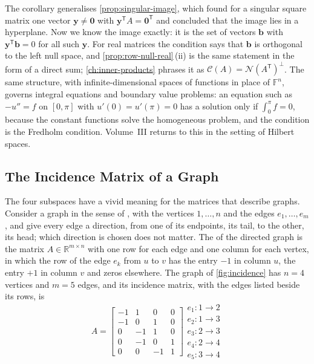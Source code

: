 The corollary generalises \cref{prop:singular-image}, which found for a singular square matrix one vector $\mathbf y\ne\mathbf 0$ with $\mathbf y^{\mathsf T}A=\mathbf 0^{\mathsf T}$ and concluded that the image lies in a hyperplane. Now we know the image exactly: it is the set of vectors $\mathbf b$ with $\mathbf y^{\mathsf T}\mathbf b=0$ for all such $\mathbf y$. For real matrices the condition says that $\mathbf b$ is orthogonal to the left null space, and \cref{prop:row-null-real}\,(ii) is the same statement in the form of a direct sum; \cref{ch:inner-products} phrases it as $\mathcal C(A)=\mathcal N(A^{\mathsf T})^\perp$. The same structure, with infinite-dimensional spaces of functions in place of $\mathbb F^n$, governs integral equations and boundary value problems: an equation such as $-u''=f$ on $[0,\pi]$ with $u'(0)=u'(\pi)=0$ has a solution only if $\int_0^\pi f=0$, because the constant functions solve the homogeneous problem, and the condition is the Fredholm condition. Volume~III returns to this in the setting of Hilbert spaces.

\subsection{The Incidence Matrix of a Graph}

The four subspaces have a vivid meaning for the matrices that describe graphs. Consider a graph in the sense of , with the vertices $1,\ldots,n$ and the edges $e_1,\ldots,e_m$, and give every edge a direction, from one of its endpoints, its tail, to the other, its head; which direction is chosen does not matter. The  of the directed graph is the matrix $A\in\mathbb R^{m\times n}$ with one row for each edge and one column for each vertex, in which the row of the edge $e_k$ from $u$ to $v$ has the entry $-1$ in column $u$, the entry $+1$ in column $v$ and zeros elsewhere. The graph of \cref{fig:incidence} has $n=4$ vertices and $m=5$ edges, and its incidence matrix, with the edges listed beside its rows, is
\[
A=\begin{bmatrix}-1&1&0&0\\-1&0&1&0\\0&-1&1&0\\0&-1&0&1\\0&0&-1&1\end{bmatrix}
\begin{matrix}e_1\colon1\to2\\e_2\colon1\to3\\e_3\colon2\to3\\e_4\colon2\to4\\e_5\colon3\to4\end{matrix}
\]

